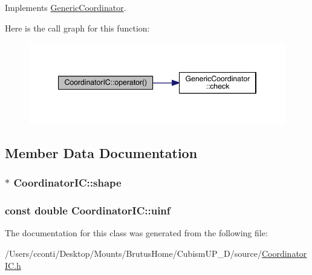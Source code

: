 Implements \hyperlink{class_generic_coordinator_a984696fef63daf7253b87ce21cce3f94}{Generic\+Coordinator}.



Here is the call graph for this function\+:\nopagebreak
\begin{figure}[H]
\begin{center}
\leavevmode
\includegraphics[width=347pt]{da/dd2/class_coordinator_i_c_a75f8e04638d34d0a726f0e1b0939be1e_cgraph}
\end{center}
\end{figure}




\subsection{Member Data Documentation}
\hypertarget{class_coordinator_i_c_ad8c925b22185d579c2cf734d597422f0}{}
\subsubsection[{shape}]{$\ast$ Coordinator\+I\+C\+::shape\hspace{0.3cm}{\ttfamily [protected]}}\label{class_coordinator_i_c_ad8c925b22185d579c2cf734d597422f0}
\hypertarget{class_coordinator_i_c_aa5b9d4280795a2dc60e9008ced9811fe}{}
\subsubsection[{uinf}]{\setlength{\rightskip}{0pt plus 5cm}const double Coordinator\+I\+C\+::uinf\hspace{0.3cm}{\ttfamily [protected]}}\label{class_coordinator_i_c_aa5b9d4280795a2dc60e9008ced9811fe}


The documentation for this class was generated from the following file\+:\begin{DoxyCompactItemize}
\item 
/\+Users/cconti/\+Desktop/\+Mounts/\+Brutus\+Home/\+Cubism\+U\+P\+\_\+D/source/\hyperlink{_coordinator_i_c_8h}{Coordinator\+I\+C.\+h}\end{DoxyCompactItemize}
